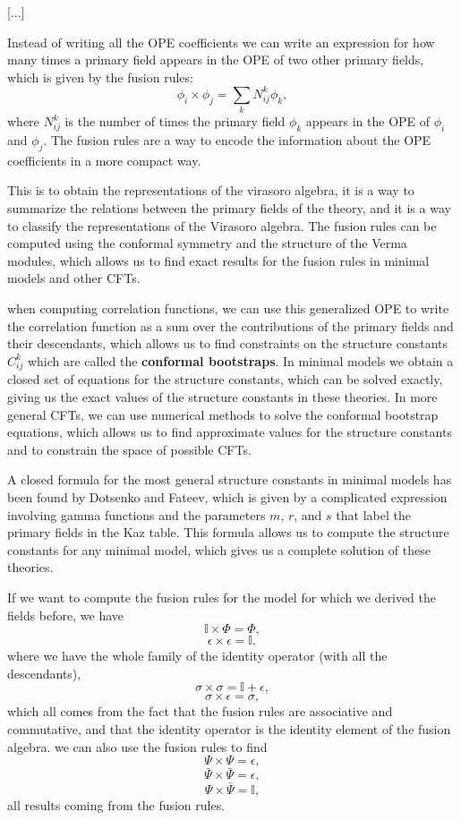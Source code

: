     [...]

Instead of writing all the OPE coefficients we can write an expression for how many times a primary field appears in the OPE of two other primary fields, which is given by the fusion rules:
\[
    \phi_i \times \phi_j = \sum_k N_{ij}^k \phi_k,
\]
where \(N_{ij}^k\) is the number of times the primary field \(\phi_k\) appears in the OPE of \(\phi_i\) and \(\phi_j\). The fusion rules are a way to encode the information about the OPE coefficients in a more compact way.

This is to obtain the representations of the virasoro algebra, it is a way to summarize the relations between the primary fields of the theory, and it is a way to classify the representations of the Virasoro algebra. The fusion rules can be computed using the conformal symmetry and the structure of the Verma modules, which allows us to find exact results for the fusion rules in minimal models and other CFTs.

when computing correlation functions, we can use this generalized OPE to write the correlation function as a sum over the contributions of the primary fields and their descendants, which allows us to find constraints on the structure constants \(C_{ij}^k\) which are called the \textbf{conformal bootstraps}. In minimal models we obtain a closed set of equations for the structure constants, which can be solved exactly, giving us the exact values of the structure constants in these theories. In more general CFTs, we can use numerical methods to solve the conformal bootstrap equations, which allows us to find approximate values for the structure constants and to constrain the space of possible CFTs.

A closed formula for the most general structure constants in minimal models has been found by Dotsenko and Fateev, which is given by a complicated expression involving gamma functions and the parameters \(m\), \(r\), and \(s\) that label the primary fields in the Kaz table. This formula allows us to compute the structure constants for any minimal model, which gives us a complete solution of these theories.

If we want to compute the fusion rules for the model for which we derived the fields before, we have
\[
    \mathbb{I} \times \Phi = \Phi,
\]
\[
    \epsilon \times \epsilon = \mathbb{I},
\]
where we have the whole family of the identity operator (with all the descendants),
\[
    \sigma \times \sigma = \mathbb{I} + \epsilon,
\]
\[
    \sigma \times \epsilon = \sigma,
\]
which all comes from the fact that the fusion rules are associative and commutative, and that the identity operator is the identity element of the fusion algebra. we can also use the fusion rules to find
\[
    \Psi \times \Psi = \epsilon,
\]
\[
    \bar{\Psi} \times \bar{\Psi} = \epsilon,
\]
\[
    \Psi \times \bar{\Psi} = \mathbb{I},
\]
all results coming from the fusion rules.

